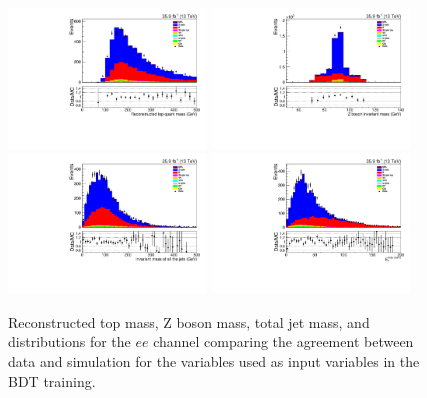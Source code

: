 \begin{figure}[htb]
\centering
\includegraphics[width=0.47\textwidth]{figs/background-estimation/plots/unblinded/prompt_ee_ttbarInc/topMass_NPL_ee_wMass_ee.pdf}
\includegraphics[width=0.47\textwidth]{figs/background-estimation/plots/unblinded/prompt_ee_ttbarInc/zPairMass_NPL_ee_wMass_ee.pdf}
\\
\includegraphics[width=0.47\textwidth]{figs/background-estimation/plots/unblinded/prompt_ee_ttbarInc/totalJetMass_NPL_ee_wMass_ee.pdf}
\includegraphics[width=0.47\textwidth]{figs/background-estimation/plots/unblinded/prompt_ee_ttbarInc/met_NPL_ee_wMass_ee.pdf}
\caption{
Reconstructed top mass, Z boson mass, total jet mass, and \MET distributions for the $ee$ channel comparing the agreement between data and simulation for the variables used as input variables in the BDT training.}
\label{fig:inputFeaturesDataSimAgreement1}
\end{figure}

